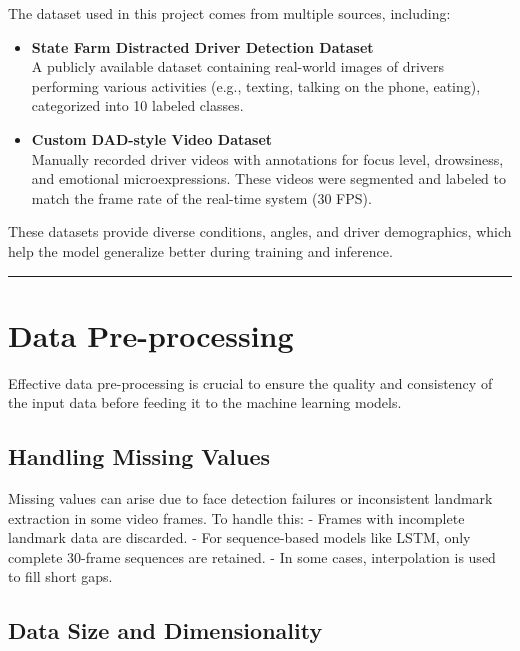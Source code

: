 \documentclass[
  letterpaper,
  DIV=11,
  numbers=noendperiod]{scrreport}
\begin{document}
The dataset used in this project comes from multiple sources, including:

\begin{itemize}
\item
  \textbf{State Farm Distracted Driver Detection Dataset}\\
  A publicly available dataset containing real-world images of drivers
  performing various activities (e.g., texting, talking on the phone,
  eating), categorized into 10 labeled classes.
\item
  \textbf{Custom DAD-style Video Dataset}\\
  Manually recorded driver videos with annotations for focus level,
  drowsiness, and emotional microexpressions. These videos were
  segmented and labeled to match the frame rate of the real-time system
  (30 FPS).
\end{itemize}

These datasets provide diverse conditions, angles, and driver
demographics, which help the model generalize better during training and
inference.

\begin{center}\rule{0.5\linewidth}{0.5pt}\end{center}

\section{Data Pre-processing}\label{data-pre-processing}

Effective data pre-processing is crucial to ensure the quality and
consistency of the input data before feeding it to the machine learning
models.

\subsection{Handling Missing Values}\label{handling-missing-values}

Missing values can arise due to face detection failures or inconsistent
landmark extraction in some video frames. To handle this: - Frames with
incomplete landmark data are discarded. - For sequence-based models like
LSTM, only complete 30-frame sequences are retained. - In some cases,
interpolation is used to fill short gaps.

\subsection{Data Size and
Dimensionality}\label{data-size-and-dimensionality}
\end{document}
